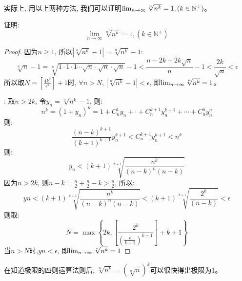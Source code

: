 \begin{remark}
    实际上, 用以上两种方法, 我们可以证明$\lim_{n \to \infty } \sqrt[n]{n^k} = 1, (k \in \mathbb{N}^+)$。
\end{remark}

\begin{example}
    证明:
    \[ \lim_{n \to \infty } \sqrt[n]{n^k}= 1, (k \in \mathbb{N}^+) \]
\end{example}
\begin{proof}
    因为$n \ge 1$, 所以$\left| \sqrt[n]{n^k} - 1 \right| = \sqrt[n]{n^k} - 1$:
    \[ \sqrt[n]{n} -1 = \sqrt[n]{1\cdot 1\cdot 1\cdots \sqrt{n} \cdot \sqrt{n} \cdot \sqrt{n} } -1 < \frac{n-2k+2k\sqrt{n}}{n} - 1 < \frac{2k}{\sqrt{n}} < \epsilon \]
    所以取$N = \left[ \frac{4k^2}{\epsilon^2}\right] + 1$时, $\forall n > N$, $\left| \sqrt[n]{n^k} - 1\right| < \epsilon$, 即$\lim_{n \to \infty } \sqrt[n]{n^k} = 1$。

    :
    取$n > 2k$, 令$y_n = \sqrt[n]{n^k} - 1$, 则:
    \begin{equation*}
        n^k = (1 + y_n)^n = 1 + C_n^1 y_n + \cdot + C_n^{k+1}y_n^{k+1} + \cdots + C_n^n y_n^n
    \end{equation*}
    则:
    \begin{equation*}
        \frac{(n-k)^{k+1}}{{(k+1)}^{k+1}}y_n^{k+1} < C_n^{k+1}y_n^{k+1} < n^k
    \end{equation*}
    则:
    \begin{equation*}
        y_n < (k+1)\sqrt[k+1]{\frac{n^k}{(n-k)^n(n-k)}}
    \end{equation*}
    因为$n > 2k$, 则$n-k = \frac{n}{2} + \frac{n}{2} - k > \frac{n}{2}$, 所以:
    \begin{equation*}
        yn < (k+1)\sqrt[k+1]{\frac{n^k}{(n-k)^n(n-k)}} < (k+1)\sqrt[k+1]{\frac{2^k}{(n-k)}} < \epsilon
    \end{equation*}
    则取:
    \begin{equation*}
        N = \max\left\{ 2k, \left[ \frac{2^k}{\left( \frac{\epsilon}{k+1} \right)^{k+1}}\right] + k + 1\right\}
    \end{equation*}
    当$n > N$时,$yn < \epsilon$, 即$\lim_{n \to \infty } \sqrt[n]{n^k} = 1$
\end{proof}
\begin{remark}
    在知道极限的四则运算法则后, $\sqrt[n]{n^k} = \left(\sqrt[n]{n}\right)^k$可以很快得出极限为1。
\end{remark}


